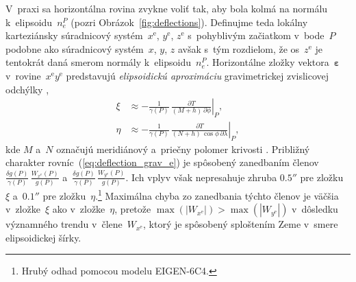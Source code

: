\documentclass[a4paper,12pt]{book}
\begin{document}
V~praxi sa horizontálna rovina zvykne voliť tak, aby bola kolmá na normálu 
k~elipsoidu~$n_e^P$ (pozri Obrázok~\ref{fig:deflections}).  Definujme teda 
lokálny karteziánsky súradnicový systém~$x^\mathrm{e}$, $y^\mathrm{e}$, 
$z^\mathrm{e}$ s~pohyblivým začiatkom v~bode~$P$ podobne ako súradnicový 
systém~$x$, $y$, $z$ avšak s~tým rozdielom, že os~$z^\mathrm{e}$ je tentokrát 
daná smerom normály k~elipsoidu~$n_e^P$.  Horizontálne zložky 
vektora~$\boldsymbol\varepsilon$ v~rovine~$x^\mathrm{e}y^\mathrm{e}$ 
predstavujú \emph{elipsoidickú aproximáciu} gravimetrickej zvislicovej odchýlky 
\parencite{Jekeli1999b},
%
\begin{equation}
\label{eq:deflection_grav_e}
\begin{split}
\xi &\approx -\frac{1}{\gamma(P)} \, \left.\frac{\partial T}{(M + h) \, 
\partial \phi}\right|_P{,}\\
%
\eta &\approx -\frac{1}{\gamma(P)} \, \left.\frac{\partial T}{(N + h) \, 
\cos\phi \, \partial \lambda}\right|_P{,}
\end{split}
\end{equation}
%
kde $M$ a~$N$ označujú meridiánový a~priečny polomer krivosti \parencite[pozri 
napríklad][]{MoritzPhysicalGeodesy}.  Približný charakter 
rovníc~(\ref{eq:deflection_grav_e}) je spôsobený zanedbaním 
členov~$\frac{\delta g(P)}{\gamma(P)} \, \frac{W_{x^\mathrm{e}}(P)}{g(P)}$ 
a~$\frac{\delta g(P)}{\gamma(P)} \, \frac{W_{y^\mathrm{e}}(P)}{g(P)}$.  Ich 
vplyv však nepresahuje zhruba $0.5''$ pre zložku~$\xi$ a~$0.1''$ pre 
zložku~$\eta$.\footnote{Hrubý odhad pomocou modelu EIGEN-6C4.}  Maximálna chyba 
zo zanedbania týchto členov je väčšia v~zložke~$\xi$ ako v~zložke~$\eta$, 
pretože $\max(|W_{x^\mathrm{e}}|) > \max(|W_{y^\mathrm{e}}|)$ v~dôsledku 
významného trendu v~člene~$W_{x^\mathrm{e}}$, ktorý je spôsobený sploštením 
Zeme v~smere elipsoidickej šírky.
\end{document}
